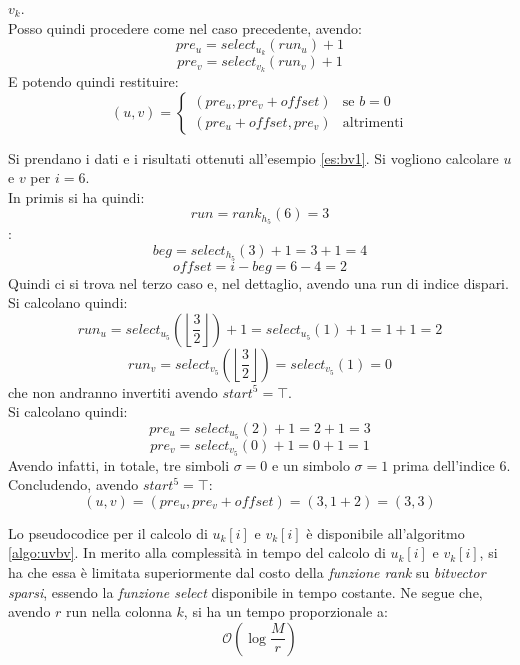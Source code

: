 \begin{enumerate}
\begin{enumerate}
    $v_k$.\\ 
    Posso quindi procedere come nel caso precedente, avendo:
    \begin{equation}
      \label{eq:bv18}
      pre_u=select_{u_k}(run_u)+1
    \end{equation}
    \begin{equation}
      \label{eq:bv19}
      pre_v=select_{v_k}(run_v)+1
    \end{equation}
    E potendo quindi restituire:
    \begin{equation}
      \label{eq:bv20}
      (u,v)=
      \begin{cases}
        (pre_u,pre_v+offset)&\mbox{se } b=0\\
        (pre_u+offset,pre_v)&\mbox{altrimenti}
      \end{cases}
    \end{equation}
  \end{enumerate}
\end{enumerate}
\begin{esempio}
  Si prendano i dati e i risultati ottenuti all'esempio \ref{es:bv1}. Si
  vogliono calcolare $u$ e $v$ per $i=6$.\\
  In primis si ha quindi:
  \[run=rank_{h_5}(6)=3\]:
  \[beg = select_{h_5}(3)+1=3+1=4\]
  \[offset = i-beg=6-4=2\]
  Quindi ci si trova nel terzo caso e, nel dettaglio, avendo una run di
  indice dispari. Si calcolano quindi:
  \[run_u=select_{u_5}\left(\left\lfloor\frac{3}{2}\right\rfloor\right)+1=
    select_{u_5}(1)+1 =1+1=2\] 
  \[run_v=select_{v_5}\left(\left\lfloor\frac{3}{2}\right\rfloor\right)=
    select_{v_5}(1)=0\] 
  che non andranno invertiti avendo $start^5=\top$.\\
  Si calcolano quindi:
  \[pre_u=select_{u_5}(2)+1=2+1=3\]
  \[pre_v=select_{v_5}(0)+1=0+1=1\]
  Avendo infatti, in totale, tre simboli $\sigma=0$ e un simbolo $\sigma=1$
  prima dell'indice 6.\\ 
  Concludendo, avendo $start^5=\top$:
  \[(u,v)=(pre_u, pre_v + offset)=(3,1+2)=(3,3)\]
\end{esempio}
Lo pseudocodice per il calcolo di $u_k[i]$ e $v_k[i]$ è disponibile
all'algoritmo \ref{algo:uvbv}. In merito alla 
complessità in tempo del calcolo di $u_k[i]$ e $v_k[i]$, si ha che essa è
limitata superiormente dal costo della \textit{funzione rank} su
\textit{bitvector sparsi}, essendo la \textit{funzione select} disponibile in
tempo costante. Ne segue che, avendo $r$ run nella colonna $k$, si ha un tempo
proporzionale a:
\begin{equation}
  \label{eq:bvuvtime}
  \mathcal{O}\left(\log\frac{M}{r}\right)
\end{equation}
